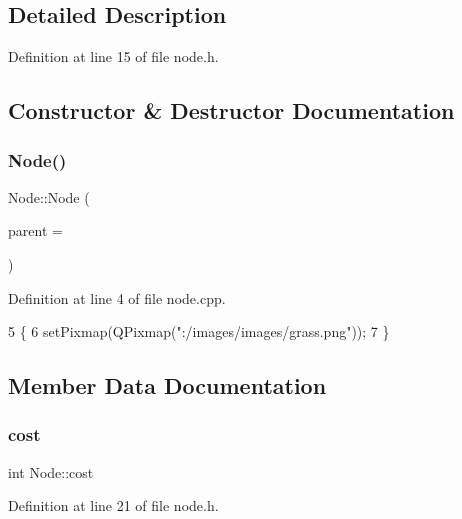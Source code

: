 \subsection{Detailed Description}


Definition at line 15 of file node.\+h.



\subsection{Constructor \& Destructor Documentation}
\mbox{\label{class_node_a99ae3b67742635b847aff323ddd29b62}} 
\subsubsection{\texorpdfstring{Node()}{Node()}}
{\footnotesize\ttfamily Node\+::\+Node (\begin{DoxyParamCaption}\item[{Q\+Graphics\+Item $\ast$}]{parent = {} }\end{DoxyParamCaption})}



Definition at line 4 of file node.\+cpp.


\begin{DoxyCode}
5 \{
6     setPixmap(QPixmap(\textcolor{stringliteral}{":/images/images/grass.png"}));
7 \}
\end{DoxyCode}


\subsection{Member Data Documentation}
\mbox{\label{class_node_aae24f318bd4b6d14270084cec3fc98b5}} 
\subsubsection{\texorpdfstring{cost}{cost}}
{\footnotesize\ttfamily int Node\+::cost}



Definition at line 21 of file node.\+h.

\mbox{\label{class_node_a32fbe9e0f4fc9e9d1845ce808738d7ab}} 
